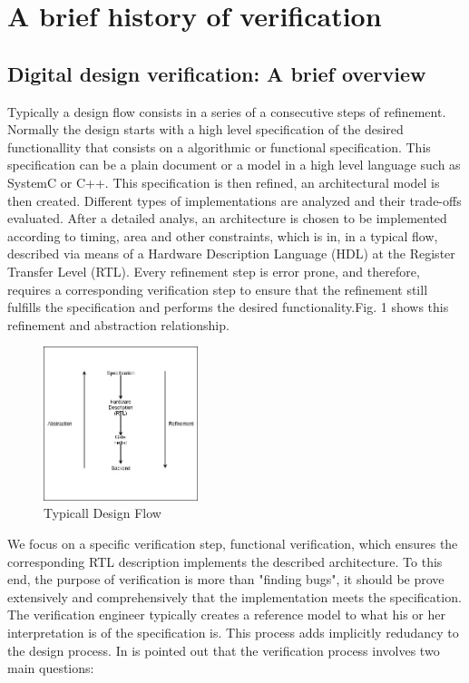 \documentclass[a4paper,11pt]{article}
\begin{document}
\section{A brief history of verification}
\subsection{Digital design verification: A brief overview}
Typically a design flow consists in a series of a consecutive steps of refinement. Normally the design starts with a high level specification of the desired functionallity that consists on a algorithmic or functional specification. This specification can be a plain document or a model in a high level language such as SystemC or C++. This specification is then refined, an architectural model is then created. Different types of implementations are analyzed and their trade-offs evaluated. After a detailed analys, an architecture is chosen to be implemented according to timing, area and other constraints, which is in, in a typical flow, described via means of a Hardware Description Language (HDL) at the Register Transfer Level (RTL). Every refinement step is error prone, and therefore, requires a corresponding verification step to ensure that the refinement still fulfills the specification and performs the desired functionality.Fig. 1 shows this refinement and abstraction relationship. 
\begin{figure}[h]
\centering
\includegraphics[width=0.4\textwidth]{design_flow.jpg}
\caption{Typicall Design Flow}
\end{figure} 
We focus on a specific verification step, functional verification, which ensures the corresponding RTL description implements the described architecture. To this end, the purpose of verification is more than "finding bugs", it should be prove extensively and comprehensively that the implementation meets the specification. The verification engineer typically creates a reference model to what his or her interpretation is of the specification is. This process adds implicitly redudancy to the design process\cite{sv_verif:sv}. In \cite{ovm_cb} is pointed out that the verification process involves two main questions:
\end{document}
